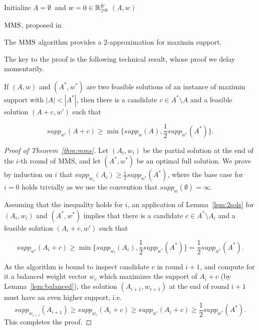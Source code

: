 \begin{algorithm}[htb]\label{alg:mms}
\SetAlgoLined
{}
Initialize $A=\emptyset$\ and $w=0\in \mathbb{R}_{\geq 0}^E$\;
\Return $(A,w)$\;
\caption{$\operatorname{MMS}$, proposed in~\cite{sanchez2016maximin}}
\end{algorithm}

\begin{theorem}\label{thm:mms}
The $\operatorname{MMS}$ algorithm provides a 2-approximation for maximin support.
\end{theorem}

The key to the proof is the following technical result, whose proof we delay momentarily.

\begin{lemma}\label{lem:2sols}
If $(A,w)$ and $(A^*, w^*)$ are two feasible solutions of an instance of maximin support with $|A|< |A^*|$, then there is a candidate $c\in A^*\setminus A$ and a feasible solution $(A+c, w')$ such that 

$$supp_{w'}(A+c)\geq \min\Big\{supp_w(A), \frac{1}{2} supp_{w^*}(A^*)\Big\}.$$
\end{lemma}


\begin{proof}[Proof of Theorem~\ref{thm:mms}]
Let $(A_i, w_i)$ be the partial solution at the end of the $i$-th round of MMS, and let $(A^*, w^*)$ be an optimal full solution. We prove by induction on $i$ that $supp_{w_i}(A_i)\geq \frac{1}{2}supp_{w^*}(A^*)$, where the base case for $i=0$ holds trivially as we use the convention that $supp_w(\emptyset)=\infty$.

Assuming that the inequality holds for $i$, an application of Lemma~\ref{lem:2sols} for $(A_i, w_i)$ and $(A^*, w^*)$ implies that there is a candidate $c\in A^*\setminus A_i$ and a feasible solution $(A_i+c, w')$ such that 

$$supp_{w'}(A_i+c)\geq \min\Big\{supp_{w_i}(A_i), \frac{1}{2} supp_{w^*}(A^*)\Big\} = \frac{1}{2} supp_{w^*}(A^*).$$

As the algorithm is bound to inspect candidate $c$ in round $i+1$, and compute for it a balanced weight vector $w_c$ which maximizes the support of $A_i+c$ (by Lemma~\ref{lem:balanced}), the solution $(A_{i+1}, w_{r+1})$ at the end of round $i+1$ must have an even higher support, i.e. %
%
$$supp_{w_{i+1}}(A_{i+1})\geq supp_{w_c}(A_i+c) 
\geq supp_{w'}(A_i+c) \geq \frac{1}{2} supp_{w^*}(A^*).$$
%
This completes the proof.
\end{proof}

